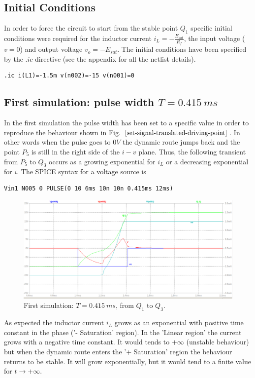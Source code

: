 \documentclass[letterpaper,11pt]{article}
\begin{document}
\subsection{Initial Conditions}
In order to force the circuit to start from the stable point $Q_1$ specific initial conditions were required for the inductor current $i_L=-\frac{E_{sat}}{R_f}$, the input voltage ($v=0$) and output voltage $v_o=-E_{sat}$. The initial conditions have been specified by the $.ic$ directive (see the appendix for all the netlist details).
\begin{verbatim}
.ic i(L1)=-1.5m v(n002)=-15 v(n001)=0
\end{verbatim}
%
\subsection{First simulation: pulse width $T=0.415\ ms$}
In the first simulation the pulse width has been set to a specific value in order to reproduce the behaviour shown in  Fig. $\ref{set-signal-translated-driving-point}$. In other words when the pulse goes to $0V$ the dynamic route jumps back and the point $P_5$ is still in the right side of the $i-v$ plane. Thus, the following transient from $P_5$ to $Q_3$ occurs as a growing exponential for $i_L$ or a decreasing exponential for $i$.
The SPICE syntax for a voltage source is
\begin{verbatim}
Vin1 N005 0 PULSE(0 10 6ms 10n 10n 0.415ms 12ms)
\end{verbatim}
%
\begin{figure}[!ht]
        \centering \includegraphics[width=0.8\columnwidth]{first-simulation-Q1-Q3.png}
        \caption{\label{first-simulation-q1-q3}First simulation: $T=0.415\ ms$, from $Q_1$ to $Q_3$.
        }
\end{figure}
%
As expected the inductor current $i_L$ grows as an exponential with positive time constant in the phase ('- Saturation' region). In the 'Linear region' the current grows with a negative time constant. It would tends to $+\infty$ (unstable behaviour) but when the dynamic route enters the '+ Saturation' region the behaviour returns to be stable. It will grow exponentially, but it would tend to a finite value for $t\rightarrow+\infty$.\\
\end{document}
